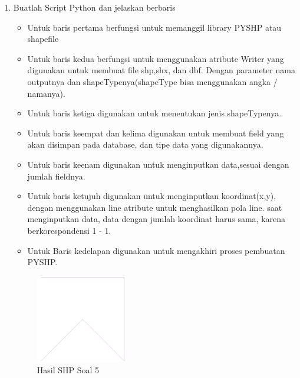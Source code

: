 \begin{enumerate}
	\item Buatlah Script Python dan jelaskan berbaris
	
	\begin{itemize}
		\item Untuk baris pertama berfungsi untuk memanggil library PYSHP atau shapefile
		\item Untuk baris kedua berfungsi untuk menggunakan atribute Writer yang digunakan untuk membuat file shp,shx, dan dbf. \hfill\break Dengan parameter nama outputnya dan shapeTypenya(shapeType bisa menggunakan angka / namanya).
		\item Untuk baris ketiga digunakan untuk menentukan jenis shapeTypenya.
		\item Untuk baris keempat dan kelima digunakan untuk membuat field yang akan disimpan pada database, dan tipe data yang digunakannya.
		\item Untuk baris keenam digunakan untuk menginputkan data,sesuai dengan jumlah fieldnya.
		\item Untuk baris ketujuh digunakan untuk menginputkan koordinat(x,y), dengan menggunakan line atribute untuk menghasilkan pola line. \hfill\break
		saat menginputkan data, data dengan jumlah koordinat harus sama, karena berkorespondensi 1 - 1.
		\item Untuk Baris kedelapan digunakan untuk mengakhiri proses pembuatan PYSHP.
	\end{itemize}
	\hfill\break
	\begin{figure}[H]
		\includegraphics[width=4cm]{figures/1174002/2/5.png}
		\centering
		\caption{Hasil SHP Soal 5}
	\end{figure}


\end{enumerate}
